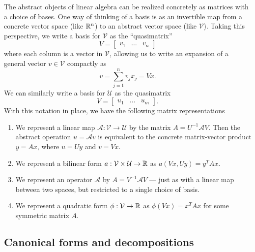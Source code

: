 \documentclass[12pt, leqno]{article} %
\begin{document}
The abstract objects of linear algebra can be realized concretely
as matrices with a choice of bases.  One way of thinking of a basis
is as an invertible map from a concrete vector space (like $\mathbb{R}^n$)
to an abstract vector space (like $\mathcal{V}$).  Taking this
perspective, we write a basis for $\mathcal{V}$ as the
``quasimatrix''
\[
  V = \begin{bmatrix} v_1 & \ldots &v_n \end{bmatrix}
\]
where each column is a vector in $\mathcal{V}$, allowing us to write
an expansion of a general vector $v \in \mathcal{V}$ compactly as
\[
  v = \sum_{j=1}^n v_j x_j = Vx.
\]
We can similarly write a basis for $\mathcal{U}$ as the quasimatrix
\[
  V = \begin{bmatrix} u_1 & \ldots &u_m \end{bmatrix}.
\]
With this notation in place, we have the following matrix
representations
\begin{enumerate}
\item We represent a linear map $\mathcal{A} : \mathcal{V} \rightarrow
  \mathcal{U}$ by the matrix $A = U^{-1} \mathcal{A} V$.  Then the abstract
  operation $u = \mathcal{A} v$ is equivalent to the concrete
  matrix-vector product $y = Ax$, where $u = Uy$ and $v = Vx$.
\item We represent a bilinear form $a : \mathcal{V} \times \mathcal{U}
  \rightarrow \mathbb{R}$ as $a(Vx, Uy) = y^T A x$.
\item We represent an operator $\mathcal{A}$ by
  $A = V^{-1} \mathcal{A} V$ --- just as with a linear map between two
  spaces, but restricted to a single choice of basis.
\item We represent a quadratic form $\phi : \mathcal{V} \rightarrow \mathbb{R}$
  as $\phi(Vx) = x^T A x$ for some symmetric matrix $A$.
\end{enumerate}

\subsection{Canonical forms and decompositions}
\end{document}
